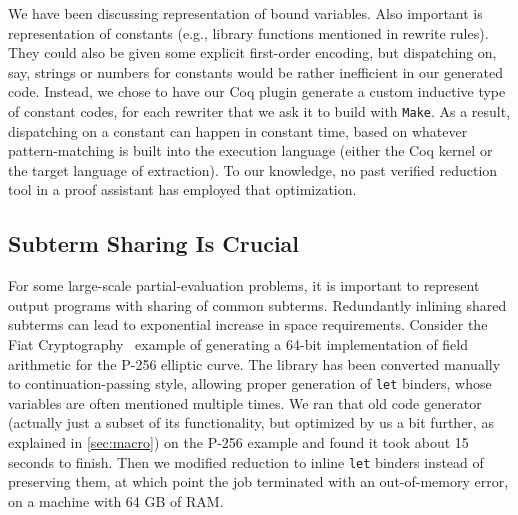 \documentclass[a4paper,USenglish,cleveref,autoref,thm-restate]{lipics-v2021}
\begin{document}
We have been discussing representation of bound variables.
Also important is representation of constants (e.g., library functions mentioned in rewrite rules).
They could also be given some explicit first-order encoding, but dispatching on, say, strings or numbers for constants would be rather inefficient in our generated code.
Instead, we chose to have our Coq plugin generate a custom inductive type of constant codes, for each rewriter that we ask it to build with \texttt{Make}.
As a result, dispatching on a constant can happen in constant time, based on whatever pattern-matching is built into the execution language (either the Coq kernel or the target language of extraction).
To our knowledge, no past verified reduction tool in a proof assistant has employed that optimization.


\subsection{Subterm Sharing Is Crucial}\label{sec:under-lets}

For some large-scale partial-evaluation problems, it is important to represent output programs with sharing of common subterms.
Redundantly inlining shared subterms can lead to exponential increase in space requirements.
Consider the Fiat Cryptography~\cite{FiatCryptoSP19} example of generating a 64-bit implementation of field arithmetic for the P-256 elliptic curve.
The library has been converted manually to continuation-passing style, allowing proper generation of \texttt{let} binders, whose variables are often mentioned multiple times.
We ran that old code generator (actually just a subset of its functionality, but optimized by us a bit further, as explained in \autoref{sec:macro}) on the P-256 example and found it took about 15 seconds to finish.
Then we modified reduction to inline \texttt{let} binders instead of preserving them, at which point the job terminated with an out-of-memory error, on a machine with 64 GB of RAM.
\end{document}
